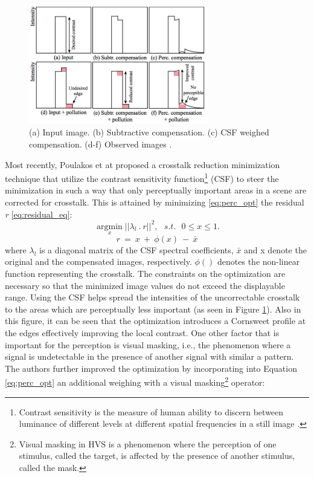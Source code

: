 \begin{figure}
\centering
    \includegraphics[width=0.7\textwidth]{./Template_Figures/perceptual_ct}
    \caption{(a) Input image. (b) Subtractive compensation. (c) CSF weighed compensation. (d-f) Observed images \cite{van2011perceptually}.\label{fig:perc_opt}}
\end{figure}
 Most recently, Poulakos et at\cite{van2011perceptually} proposed a crosstalk reduction minimization technique that utilize the contrast sensitivity function\footnote{Contrast sensitivity is the measure of human ability to discern between luminance of different levels at different spatial frequencies in a still image \cite{ wiki:CSF}. } (CSF) to steer the minimization in such a way that only perceptually important areas in a scene are corrected for crosstalk. This is attained by minimizing \ref{eq:perc_opt} the residual \emph{r} \ref{eq:residual_eq}:
 \begin{equation}
\underset{x}{\operatorname{argmin}}||\lambda_l \: . \: r||^2, \:\:\: s.t. \:\:\: 0 \leq x \leq 1.
\label{eq:perc_opt}
\end{equation}
\begin{equation}
r\: = \: x\: + \: \phi(x)\: - \: \bar{x}
\label{eq:residual_eq}
\end{equation}
where $\lambda_l$ is a diagonal matrix of the CSF spectral coefficients, $\bar{x}$ and x denote the original and the compensated images, respectively. $\phi()$ denotes the non-linear function representing the crosstalk. The constraints on the optimization are necessary so that the minimized image values do not exceed the displayable range. Using the CSF helps spread the intensities of the uncorrectable crosstalk to the areas which are perceptually less important (as seen in Figure \ref{fig:perc_opt}). Also in this figure, it can be seen that the optimization introduces a Cornsweet profile at the edges effectively improving the local contrast. One other factor that is important for the perception is visual masking, i.e., the phenomenon where a signal is undetectable in the presence of another signal with similar a pattern. The authors further improved the optimization by incorporating into Equation \ref{eq:perc_opt} an additional weighing with a visual masking\footnote{Visual masking in HVS is a phenomenon where the perception of one stimulus, called the target, is affected by the presence of another stimulus, called the mask.} operator:
